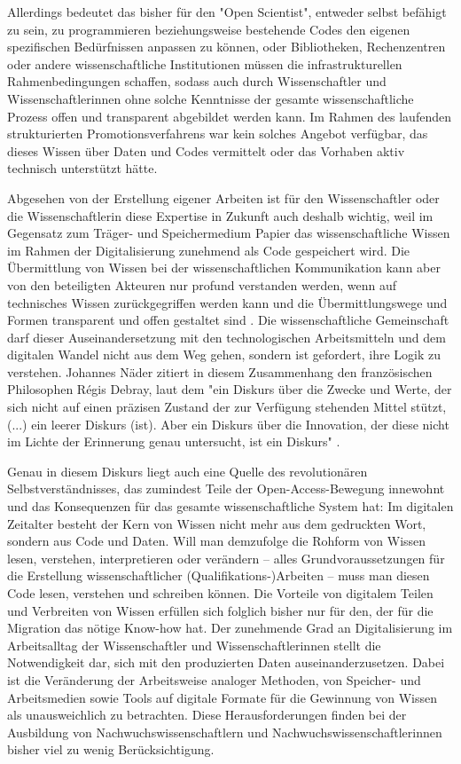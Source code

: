 Allerdings bedeutet das bisher für den "Open Scientist", entweder selbst befähigt zu sein, zu programmieren beziehungsweise bestehende Codes den eigenen spezifischen Bedürfnissen anpassen zu können, oder Bibliotheken, Rechenzentren oder andere wissenschaftliche Institutionen müssen die infrastrukturellen Rahmenbedingungen schaffen, sodass auch durch Wissenschaftler und Wissenschaftlerinnen ohne solche Kenntnisse der gesamte wissenschaftliche Prozess offen und transparent abgebildet werden kann. Im Rahmen des laufenden strukturierten Promotionsverfahrens war kein solches Angebot verfügbar, das dieses Wissen über Daten und Codes vermittelt oder das Vorhaben aktiv technisch unterstützt hätte.

Abgesehen von der Erstellung eigener Arbeiten ist für den Wissenschaftler oder die Wissenschaftlerin diese Expertise in Zukunft auch deshalb wichtig, weil im Gegensatz zum Träger- und Speichermedium Papier das wissenschaftliche Wissen im Rahmen der Digitalisierung zunehmend als Code gespeichert wird. Die Übermittlung von Wissen bei der wissenschaftlichen Kommunikation kann aber von den beteiligten Akteuren nur profund verstanden werden, wenn auf technisches Wissen zurückgegriffen werden kann und die Übermittlungswege und Formen transparent und offen gestaltet sind \cite{davis_2011_open}. Die wissenschaftliche Gemeinschaft darf dieser Auseinandersetzung mit den technologischen Arbeitsmitteln und dem digitalen Wandel nicht aus dem Weg gehen, sondern ist gefordert, ihre Logik zu verstehen. Johannes Näder zitiert in diesem Zusammenhang den französischen Philosophen Régis Debray, laut dem "ein Diskurs über die Zwecke und Werte, der sich nicht auf einen präzisen Zustand der zur Verfügung stehenden Mittel stützt, (...) ein leerer Diskurs (ist). Aber ein Diskurs über die Innovation, der diese nicht im Lichte der Erinnerung genau untersucht, ist ein Diskurs" \cite[:117]{naeder_2010_open} \cite[:246]{debray2003einfuhrung}.

Genau in diesem Diskurs liegt auch eine Quelle des revolutionären Selbstverständnisses, das zumindest Teile der Open-Access-Bewegung innewohnt und das Konsequenzen für das gesamte wissenschaftliche System hat: Im digitalen Zeitalter besteht der Kern von Wissen nicht mehr aus dem gedruckten Wort, sondern aus Code und Daten. Will man demzufolge die Rohform von Wissen lesen, verstehen, interpretieren oder verändern – alles Grundvoraussetzungen für die Erstellung wissenschaftlicher (Qualifikations-)Arbeiten – muss man diesen Code lesen, verstehen und schreiben können. Die Vorteile von digitalem Teilen und Verbreiten von Wissen erfüllen sich folglich bisher nur für den, der für die Migration das nötige Know-how hat. Der zunehmende Grad an Digitalisierung im Arbeitsalltag der Wissenschaftler und Wissenschaftlerinnen stellt die Notwendigkeit dar, sich mit den produzierten Daten auseinanderzusetzen. Dabei ist die Veränderung der Arbeitsweise analoger Methoden, von Speicher- und Arbeitsmedien sowie Tools auf digitale Formate für die Gewinnung von Wissen als unausweichlich zu betrachten. Diese Herausforderungen finden bei der Ausbildung von Nachwuchswissenschaftlern und Nachwuchswissenschaftlerinnen bisher viel zu wenig Berücksichtigung.

